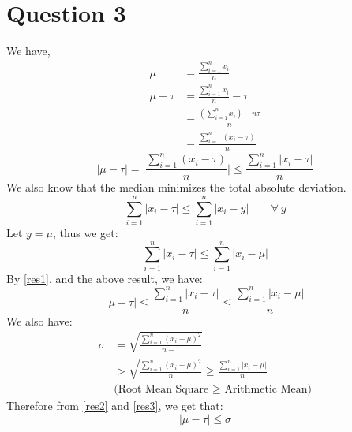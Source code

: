 \documentclass[11pt]{article}
\begin{document}
\newpage
\section*{Question 3}
\setcounter{equation}{0}
We have,
\begin{equation*}
    \begin{split}
        \mu &= \frac{\sum_{i=1}^n x_i}{n} \\
        \mu - \tau &= \frac{\sum_{i=1}^n x_i}{n} - \tau \\
            &= \frac{(\sum_{i=1}^nx_i) - n\tau}{n} \\
            &= \frac{\sum_{i=1}^n (x_i - \tau)}{n}
    \end{split}
\end{equation*} 
\begin{equation}
    \label{res1}
    |\mu - \tau| = \Bigg|\frac{\sum_{i=1}^n (x_i - \tau)}{n}\Bigg| \le \frac{\sum_{i=1}^n |x_i - \tau|}{n}
\end{equation}
We also know that the median minimizes the total absolute deviation.
\begin{equation*}
    \sum_{i=1}^n |x_i - \tau| \le \sum_{i=1}^n |x_i - y| \hspace{2em} \forall \ y 
\end{equation*}
Let $y = \mu$, thus we get:
\begin{equation*}
    \sum_{i=1}^n |x_i - \tau| \le \sum_{i=1}^n |x_i - \mu|
\end{equation*}     
By \eqref{res1}, and the above result, we have:
\begin{equation}
    \label{res2}
    |\mu - \tau| \le \frac{\sum_{i=1}^n |x_i - \tau|}{n} \le \frac{\sum_{i=1}^n |x_i - \mu|}{n}
\end{equation}
We also have:
\begin{equation}
    \label{res3}
    \begin{split}
        \sigma &= \sqrt{\frac{\sum_{i=1}^n (x_i - \mu)^2}{n-1}} \\
            &> \sqrt{\frac{\sum_{i=1}^n (x_i - \mu)^2}{n}} \ge \frac{\sum_{i=1}^n |x_i - \mu|}{n} \hspace{2em} \\
            &\text{(Root Mean Square $\ge$ Arithmetic Mean)}
    \end{split}
\end{equation}
Therefore from \eqref{res2} and \eqref{res3}, we get that:
\begin{equation*}
    |\mu - \tau| \le \sigma
\end{equation*}
\hfill \qedsymbol \\
\end{document}
